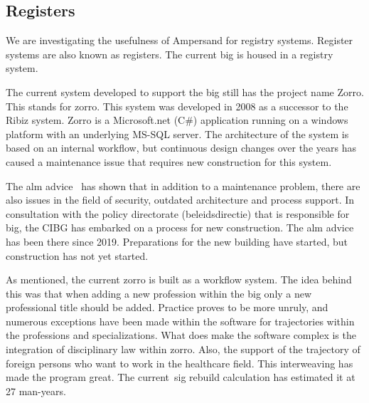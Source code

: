 \subsection{Registers} \label{registers}
We are investigating the usefulness of Ampersand for registry systems.
Register systems are also known as registers.
The current \acrshort{big} is housed in a registry system.

The current system developed to support the \acrshort{big} still has the project name Zorro.
This stands for \acrlong{zorro}.
This system was developed in 2008 as a successor to the Ribiz system.
Zorro is a Microsoft.net (C\#) application running on a windows platform with an underlying MS-SQL server.
The architecture of the system is based on an internal workflow, but continuous design changes over the years
has caused a maintenance issue that requires new construction for this system.

The \acrfull{alm} advice~ has shown that in addition to a maintenance problem, there are also issues in the field of security, outdated architecture and process support.
In consultation with the policy directorate (beleidsdirectie) that is responsible for \acrshort{big}, the CIBG has embarked on a process for new construction.
The \acrshort{alm} advice has been there since 2019.
Preparations for the new building have started, but construction has not yet started.

As mentioned, the current \acrshort{zorro} is built as a workflow system.
The idea behind this was that when adding a new profession within the \acrshort{big} only a new professional title should be added.
Practice proves to be more unruly, and numerous exceptions have been made within the software for trajectories within the professions and specializations.
What does make the software complex is the integration of disciplinary law within \acrshort{zorro}.
Also, the support of the trajectory of foreign persons who want to work in the healthcare field.
This interweaving has made the program great.
The current~\acrfull{sig} rebuild calculation has estimated it at 27 man-years.

